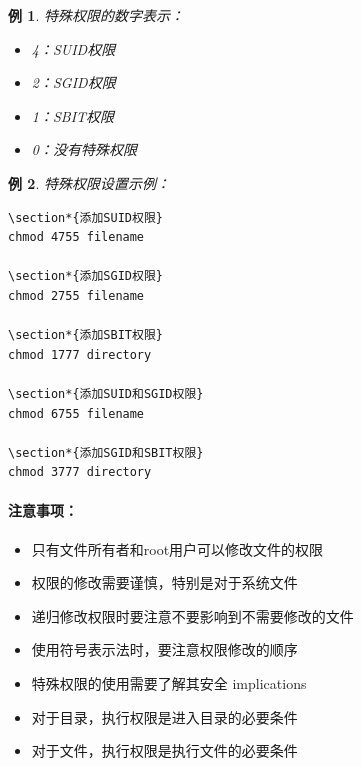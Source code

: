 \documentclass[12pt,UTF8]{ctexbook}
\newtheorem{example}{例}[chapter]
\begin{document}
\begin{example}
特殊权限的数字表示：
\begin{itemize}
    \item 4：SUID权限
    \item 2：SGID权限
    \item 1：SBIT权限
    \item 0：没有特殊权限
\end{itemize}
\end{example}

\begin{example}
特殊权限设置示例：
\begin{verbatim}
\section*{添加SUID权限}
chmod 4755 filename

\section*{添加SGID权限}
chmod 2755 filename

\section*{添加SBIT权限}
chmod 1777 directory

\section*{添加SUID和SGID权限}
chmod 6755 filename

\section*{添加SGID和SBIT权限}
chmod 3777 directory
\end{verbatim}
\end{example}

\paragraph{注意事项：}
\begin{itemize}
    \item 只有文件所有者和root用户可以修改文件的权限
    \item 权限的修改需要谨慎，特别是对于系统文件
    \item 递归修改权限时要注意不要影响到不需要修改的文件
    \item 使用符号表示法时，要注意权限修改的顺序
    \item 特殊权限的使用需要了解其安全 implications
    \item 对于目录，执行权限是进入目录的必要条件
    \item 对于文件，执行权限是执行文件的必要条件
\end{itemize}
\end{document}
